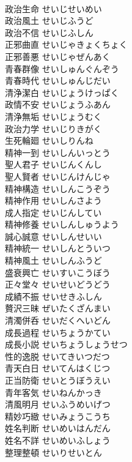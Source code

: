 \documentclass[8pt]{extreport}
\begin{document}
\begin{CJK}{UTF8}{min}
\\	政治生命	せいじせいめい	
\\	政治風土	せいじふうど	
\\	政治不信	せいじふしん	
\\	正邪曲直	せいじゃきょくちょく	
\\	正邪善悪	せいじゃぜんあく	
\\	青春群像	せいしゅんぐんぞう	
\\	青春時代	せいしゅんじだい	
\\	清浄潔白	せいじょうけっぱく	
\\	政情不安	せいじょうふあん	
\\	清浄無垢	せいじょうむく	
\\	政治力学	せいじりきがく	
\\	生死輪廻	せいしりんね	
\\	精神一到	せいしんいっとう	
\\	聖人君子	せいじんくんし	
\\	聖人賢者	せいじんけんじゃ	
\\	精神構造	せいしんこうぞう	
\\	精神作用	せいしんさよう	
\\	成人指定	せいじんしてい	
\\	精神修養	せいしんしゅうよう	
\\	誠心誠意	せいしんせいい	
\\	精神統一	せいしんとういつ	
\\	精神風土	せいしんふうど	
\\	盛衰興亡	せいすいこうぼう	
\\	正々堂々	せいせいどうどう	
\\	成績不振	せいせきふしん	
\\	贅沢三昧	ぜいたくざんまい	
\\	清濁併呑	せいだくへいどん	
\\	成長過程	せいちょうかてい	
\\	成長小説	せいちょうしょうせつ	
\\	性的逸脱	せいてきいつだつ	
\\	青天白日	せいてんはくじつ	
\\	正当防衛	せいとうぼうえい	
\\	青年客気	せいねんかっき	
\\	清風明月	せいふうめいげつ	
\\	精妙巧緻	せいみょうこうち	
\\	姓名判断	せいめいはんだん	
\\	姓名不詳	せいめいふしょう	
\\	整理整頓	せいりせいとん	

\end{CJK}
\end{document}
